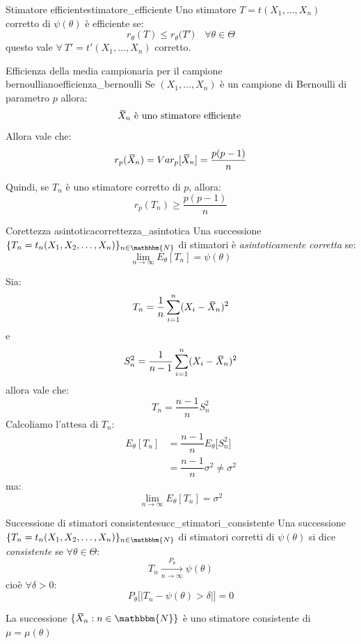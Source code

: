 \documentclass[12pt]{report}
\newcounter{theorem}
\newcounter{definition}
\newcommand{\nmu}{}
\newcommand{\wbar}[1]{%
	\accentset{\mbox{\rule{0.55em}{0.5pt}}}{#1}%
}
\begin{document}
	\begin{definition}{\nmu Stimatore efficiente}{stimatore_efficiente}
		Uno stimatore $T=t(X_1, \dots, X_n)$ corretto di $\psi(\theta)$ è efficiente se:
		\[
		r_\theta(T) \leq r_\theta\big(T '\big) \quad \forall \theta \in \Theta
		\]
		questo vale $\forall\ T'=t'(X_1, \dots, X_n)$ corretto.
	\end{definition}
	\begin{theorem}{\nmu Efficienza della media campionaria per il campione bernoulliano}{efficienza_bernoulli}
		Se $(X_1, \dots, X_n)$ è un campione di Bernoulli di parametro $p$ allora:
		\[
		\wbar{X}_n \text{ è uno stimatore efficiente }
		\]
		Allora vale che:
		\[r_p(\wbar{X}_n) = Var_p[\wbar{X}_n] = \dfrac{p(p-1)}{n}\]

		Quindi, se $T_n$ è uno stimatore corretto di $p$, allora:
		\[
		r_p(T_n) \geq \dfrac{p(p-1)}{n}
		\]
	\end{theorem}
	\begin{definition}{\nmu Corettezza asintotica}{correttezza_asintotica}
		Una successione $\{T_n=t_n(X_1, X_2, \dots, X_n)\}_{n \in \mathbbm{N}}$ di stimatori è \textit{asintoticamente corretta}  se:
		\[
		\lim\limits_{n \to \infty}E_\theta[T_n] = \psi(\theta)
		\]
	\end{definition}
	\begin{example}{}{}
		Sia:
		\[
		T_n = \dfrac{1}{n}\sum_{i=1}^{n}(X_i - \wbar{X}_n)^2
		\]
		e
		\[
		S_n^2 = \dfrac{1}{n-1}\sum_{i=1}^{n}(X_i - \wbar{X}_n)^2
		\]
		allora vale che:
		\[
		T_n = \dfrac{n-1}{n}S_n^2
		\]
		Calcoliamo l'attesa di $T_n$:
		\begin{align*}
		E_\theta[T_n] &= \dfrac{n-1}{n}E_\theta\big[S_n^2\big] \\
		&= \dfrac{n-1}{n}\sigma^2 \neq \sigma^2
		\end{align*}
		ma:
		\[
		\lim\limits_{n \to \infty}E_\theta[T_n] = \sigma^2
		\]
	\end{example}
	\begin{definition}{\nmu Successione di stimatori consistente}{succ_stimatori_consistente}
		Una successione $\{T_n=t_n(X_1, X_2, \dots, X_n)\}_{n \in \mathbbm{N}}$ di stimatori corretti di $\psi(\theta)$ si dice \textit{consistente} se $\forall \theta \in \Theta$:
		\[
		T_n \underset{n \to \infty}{\overset{P_\theta}{\longrightarrow}} \psi(\theta)
		\]
		cioè $\forall \delta > 0$:
		\[
		P_\theta\bigg[\Big|T_n - \psi(\theta) > \delta\Big|\bigg] = 0
		\]
	\end{definition}
	\begin{example}{}{}
		La successione $\{\wbar{X}_n : n \in \mathbbm{N}\}$ è uno stimatore consistente di $\mu = \mu(\theta)$
	\end{example}
\end{document}
